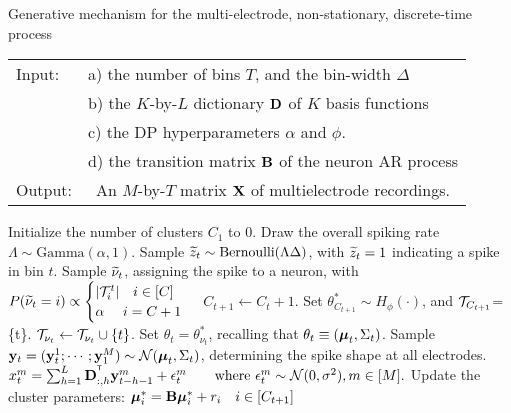 \begin{algorithm}
\caption{Generative mechanism for the multi-electrode, non-stationary, discrete-time process}\label{alg:gen_proc}
\begin{tabular}{p{1.2cm}p{12.4cm}}
Input:&  a) the number of bins $T$, and the bin-width $\Delta$\\
  &  b) the $K$-by-$L$ dictionary $\mathbf{D}$ of $K$ basis functions\\
  &  c) the DP hyperparameters $\alpha$ and $\phi$.\\ 
  &  d) the transition matrix $\mathbf{B}$ of the neuron AR process \\
Output:& \  An $M$-by-$T$ matrix $\mathbf{X}$ of multielectrode recordings. %
\end{tabular}
\begin{algorithmic}[1]
\State Initialize the number of clusters $C_1$ to $0$.
\State Draw the overall spiking rate $\Lambda \sim \text{Gamma}(\alpha, 1)$.
\State Sample $\widetilde{z}_t \sim \text{Bernoulli}(\Lambda \Delta)$, with $\widetilde{z}_t = 1$ indicating a spike in bin $t$.
   \label{enum:thin}
  \State Sample $\widetilde{\nu}_t$, assigning the spike to a neuron, with
$  P({\widetilde{\nu}_t} = i) \propto 
  \begin{cases}
   |\mathcal{T}^t_i| \quad i \in [C] \\
   \alpha \quad\ i = C + 1 \\
  \end{cases}$
          \State  $C_{t+1} \leftarrow C_t + 1$. 
		\State Set $\theta^*_{C_{t+1}} \sim H_{\phi}(\cdot)$, and $\mathcal{T}_{C_{t+1}}$=\{t\}.
       \Else \State  $\mathcal{T}_{\nu_t} \leftarrow \mathcal{T}_{\nu_t} \cup \{t\}$.
    \EndIf
\State Set $\theta_t = \theta^*_{\nu_t}$, recalling that $\theta_t \equiv (\boldsymbol{\mu}_t, \Sigma_t)$.
\State Sample $\by_t = (\by^1_t; \cdots; \by^M_1) %
           \sim \mathcal{N}(\mb{\mu}_t, \Sigma_t)$, determining the spike shape at all electrodes.
\State $ x^m_t = \sum_{h = 1}^L \mathbf{D}_{:,h}^{^{\mathsf{T}}} \mathbf{y}^m_{t-h-1} + \epsilon^m_t \text{\qquad where $\epsilon^m_t \sim \mathcal{N}(0,\sigma^2), m \in [M]$.} $
\State Update the cluster parameters: ${\boldsymbol{\mu}}^*_i = \mathbf{B} {\boldsymbol{\mu}}^*_i + r_i \quad i \in [C_{t+1}]$
\EndIf
\EndFor
\end{algorithmic}
\end{algorithm}

